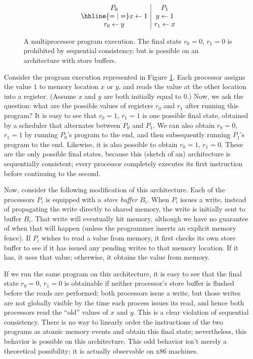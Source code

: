 \documentclass[]{eptcs}
\begin{document}
\begin{figure}[t]
\[
\begin{array}{c|c}
P_0   &   P_1 \\ \hhline{=|=}
x \leftarrow 1   & y \leftarrow 1 \\ 
r_0 \leftarrow y & r_1 \leftarrow x \\ 
\end{array}
\]
\caption{A multiprocessor program execution. The final state $r_0 = 0$, $r_1 = 0$ is prohibited by sequential consistency, but is possible on an architecture with store buffers.}
\label{sb}
\end{figure}

Consider the program execution represented in Figure \ref{sb}. Each processor assigns the value $1$ to memory location $x$ or $y$, and reads the value at the other location into a register. (Assume $x$ and $y$ are both initially equal to $0$.) Now, we ask the question: what are the possible values of registers $r_0$ and $r_1$ after running this program? It is easy to see that $r_0 = 1$, $r_1 = 1$ is one possible final state, obtained by a scheduler that alternates between $P_0$ and $P_1$. We can also obtain $r_0 = 0$, $r_1 = 1$ by running $P_0$'s program to the end, and then subsequently running $P_1$'s program to the end. Likewise, it is also possible to obtain $r_0 = 1$, $r_1 = 0$. These are the only possible final states, because this (sketch of an) architecture is sequentially consistent; every processor completely executes its first instruction before continuing to the second.

Now, consider the following modification of this architecture. Each of the processors $P_i$ is equipped with a \emph{store buffer} $B_i$. When $P_i$ issues a write, instead of propagating the write directly to shared memory, the write is initially sent to buffer $B_i$. That write will eventually hit memory, although we have no guarantee of when that will happen (unless the programmer inserts an explicit memory fence). If $P_i$ wishes to read a value from memory, it first checks its own store buffer to see if it has issued any pending writes to that memory location. If it has, it uses that value; otherwise, it obtains the value from memory. 

If we run the same program on this architecture, it is easy to see that the final state $r_0 = 0$, $r_1 = 0$ is obtainable if neither processor's store buffer is flushed before the reads are performed; both processors issue a write, but those writes are not globally visible by the time each process issues its read, and hence both processors read the ``old'' values of $x$ and $y$. This is a clear violation of sequential consistency. There is no way to linearly order the instructions of the two programs as atomic memory events and obtain this final state; nevertheless, this behavior is possible on this architecture. This odd behavior isn't merely a theoretical possibility; it is actually observable on x86 machines.
\end{document}
